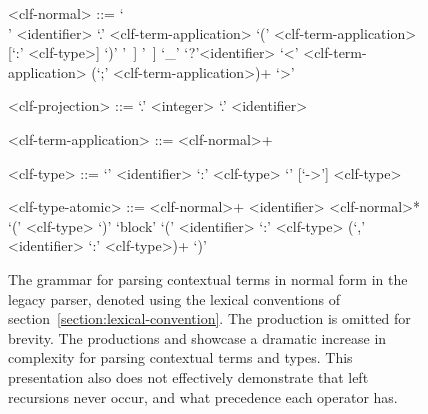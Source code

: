 \begin{figure}[H]
\begin{grammar}
<clf-normal> ::=
     `\\' <identifier> `.' <clf-term-application>
\alt `(' <clf-term-application> [`:' <clf-type>] `)'
\alt <hash-identifier> [<clf-projection>] [ `[' <clf-substitution> `]' ]
\alt <qualified-identifier> [<clf-projection>] [ `[' <clf-substitution> `]' ]
\alt `_'
\alt `?'<identifier>
\alt `<' <clf-term-application> (`;' <clf-term-application>)+ `>'

<clf-projection> ::=
     `.' <integer>
\alt `.' <identifier>

<clf-term-application> ::=
     <clf-normal>+

<clf-type> ::=
     `{' <identifier> `:' <clf-type> `}' [`->'] <clf-type>

<clf-type-atomic> ::=
     <clf-normal>+
\alt <identifier> <clf-normal>*
\alt `(' <clf-type> `)'
\alt `block' `(' <identifier> `:' <clf-type> (`,' <identifier> `:' <clf-type>)+ `)'
\end{grammar}
\caption[The grammar for parsing contextual \acs{LF} terms in normal form in the legacy parser.]{%
The grammar for parsing contextual \LF terms in normal form in the legacy parser, denoted using the lexical conventions of section~\ref{section:lexical-convention}.
The production  is omitted for brevity.
The productions  and  showcase a dramatic increase in complexity for parsing contextual \LF terms and types.
This presentation also does not effectively demonstrate that left recursions never occur, and what precedence each operator has.
}
\label{figure:legacy-clf-parsing}
\end{figure}

